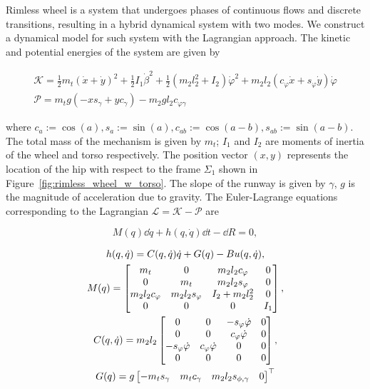 Rimless wheel is a system that undergoes phases of continuous flows and discrete
transitions, resulting in a hybrid dynamical system with two modes. We construct
a dynamical model for such system with the Lagrangian approach. The kinetic and
potential energies of the system are given by

\begin{equation*}
  \begin{gathered}
    \mathcal{K} = \frac{1}{2} m_t(\dot{x} + \dot{y})^2  +  \frac{1}{2} I_1 \dot{\beta}^2  + 
                    \frac{1}{2} (m_2 l_2^2 + I_2) \dot{\varphi}^2 + m_2 l_2(c_{\varphi} \dot{x} + s_{\varphi} \dot{y}) \dot{\varphi} \\
    \mathcal{P} = m_tg(-x s_{\gamma} + y c_\gamma) - m_2 g l_2 c_{\varphi \gamma}
  \end{gathered}
\end{equation*}

\noindent where $c_a := \cos{(a)}, s_a := \sin{(a)}, c_{ab} := \cos{(a - b)},
s_{ab} := \sin{(a - b)}$. The total mass of the mechanism is given by $m_t$;
$I_1$ and $I_2$ are moments of inertia of the wheel and torso respectively. The
position vector $(x, y)$ represents the location of the hip with respect to the
frame $\Sigma_1$ shown in Figure~\ref{fig:rimless_wheel_w_torso}. The slope of
the runway is given by $\gamma$, $g$ is the magnitude of acceleration due to
gravity.
%
The Euler-Lagrange equations corresponding to the Lagrangian $\mathcal{L} =
\mathcal{K} - \mathcal{P}$ are

\begin{equation}
  M(q) \dd \dot{q} + h(q, \dot{q})\dd t - \dd R  = 0,
  \label{eq:dynamics}
\end{equation}

\begin{equation*}
  \begin{gathered}
    h(q, \dot{q}) = C(q, \dot{q})\dot{q} + G(q) - Bu(q, \dot{q}),\\
    M(q) = \begin{bmatrix}m_t & 0 & m_2 l_2 c_{\varphi} & 0 \\ 0 & m_t & m_2 l_2 s_{\varphi} & 0 \\
            m_2 l_2 c_{\varphi} & m_2 l_2 s_{\varphi} & I_2+m_2 l_2^2 & 0 \\
            0 & 0 & 0 & I_1\end{bmatrix}, \\
    C(q,\dot{q}) = m_2l_2 \begin{bmatrix}0 & 0 & -s_{\varphi} \dot{\varphi} & 0\\ 
                    0 & 0 & c_{\varphi} \dot{\varphi} & 0 \\ 
                    -s_{\varphi} \dot{\varphi} & c_{\varphi} \dot{\varphi} & 0 & 0 \\
                    0 & 0 & 0 & 0\end{bmatrix}, \\
    G(q) = g\begin{bmatrix}-m_t s_{\gamma} & 
                  m_t c_{\gamma} &
                  m_2 l_2 s_{\phi,\gamma} &
                  0\end{bmatrix}^\top \\
  \end{gathered}
\end{equation*}

